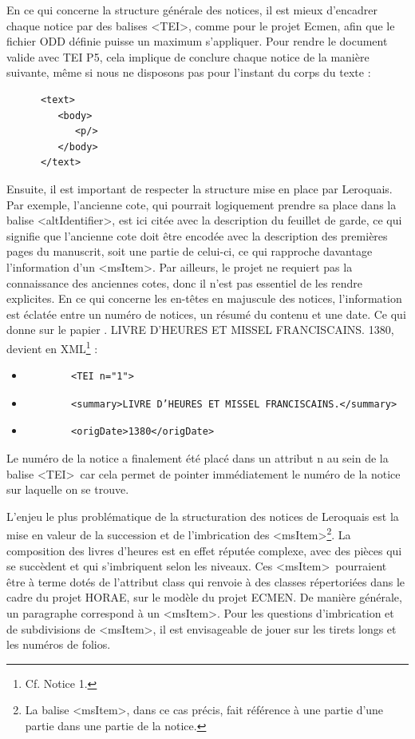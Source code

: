 \documentclass[a4paper,12pt,twoside]{book}
\begin{document}
En ce qui concerne la structure générale des notices, il est mieux d'encadrer chaque notice par des balises \textless TEI\textgreater, comme pour le projet Ecmen, afin que le fichier ODD définie puisse un maximum s’appliquer. Pour rendre le document valide avec TEI P5, cela implique de conclure chaque notice de la manière suivante, même si nous ne disposons pas pour l'instant du corps du texte :
\begin{verbatim}
      <text>
         <body>
            <p/>
         </body>
      </text>
\end{verbatim}
Ensuite, il est important de respecter la structure mise en place par Leroquais. Par exemple, l’ancienne cote, qui pourrait logiquement prendre sa place dans la balise \textless altIdentifier\textgreater, est ici citée avec la description du feuillet de garde, ce qui signifie que l’ancienne cote doit être encodée avec la description des premières pages du manuscrit, soit une partie de celui-ci, ce qui rapproche davantage l'information d'un \textless msItem\textgreater . Par ailleurs, le projet ne requiert pas la connaissance des anciennes cotes, donc il n’est pas essentiel de les rendre explicites. 
En ce qui concerne les en-têtes en majuscule des notices, l’information est éclatée entre un numéro de notices, un résumé du contenu et une date. Ce qui donne sur le papier . LIVRE D’HEURES ET MISSEL FRANCISCAINS. 1380\fg{}, devient en XML\footnote{Cf. Notice 1.} : 
\begin{itemize}
    \item \begin{verbatim}
        <TEI n="1">
    \end{verbatim}
    \item \begin{verbatim}
        <summary>LIVRE D’HEURES ET MISSEL FRANCISCAINS.</summary>
    \end{verbatim}
    \item \begin{verbatim}
        <origDate>1380</origDate>
    \end{verbatim}
\end{itemize}
Le numéro de la notice a finalement été placé dans un attribut \og n\fg{} au sein de la balise \textless TEI\textgreater~car cela permet de pointer immédiatement le numéro de la notice sur laquelle on se trouve. 

L'enjeu le plus problématique de la structuration des notices de Leroquais est la mise en valeur de la succession et de l'imbrication des \textless msItem\textgreater \footnote{La balise \textless msItem\textgreater, dans ce cas précis, fait référence à une partie d'une partie dans une partie de la notice.}. La composition des livres d’heures est en effet réputée complexe, avec des pièces qui se succèdent et qui s’imbriquent selon les niveaux. Ces \textless msItem\textgreater~pourraient être à terme dotés de l’attribut class qui renvoie à des classes répertoriées dans le cadre du projet HORAE, sur le modèle du projet ECMEN. De manière générale, un paragraphe correspond à un \textless msItem\textgreater . Pour les questions d'imbrication et de subdivisions de \textless msItem\textgreater, il est envisageable de jouer sur les tirets longs et les numéros de folios. 
\end{document}
